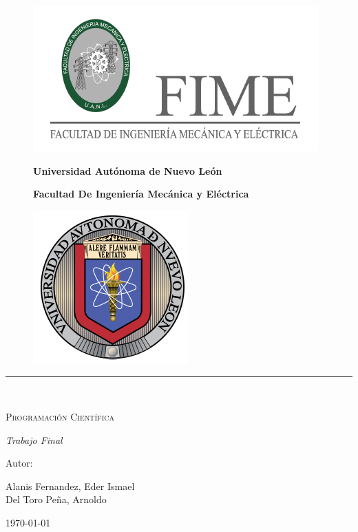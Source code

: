 \documentclass{article}
\begin{document}
\begin{titlepage}
		\begin{figure}
		\begin{minipage}[c]{0.15 \linewidth}
			\includegraphics[scale = 0.3]{fime.jpg}
		\end{minipage} \hspace{0.5 cm}
		\begin{minipage}[t]{0.6 \linewidth}
		    {\bfseries \centering \Large Universidad Autónoma de Nuevo León \par}
		{\centering \bfseries \large Facultad De Ingeniería  Mecánica y Eléctrica \par}
		\end{minipage} \hspace{0.5 cm}
		\begin{minipage}[c]{0.15 \linewidth}
			\includegraphics[scale= 0.3]{uanl.png}
		\end{minipage}
		\end{figure}
		
		\centering
		
		\rule {\linewidth}{0.75mm} \\
		\vspace{3cm}
		{\scshape\Huge Programación Científica \par}
		\vspace{3cm}
		{\itshape\Large Trabajo Final \par}
		\vfill
		{\Large Autor: \par}
		{\Large Alanis Fernandez, Eder Ismael \\ Del Toro Peña, Arnoldo  \par}
		\today
	\end{titlepage}
\end{document}
